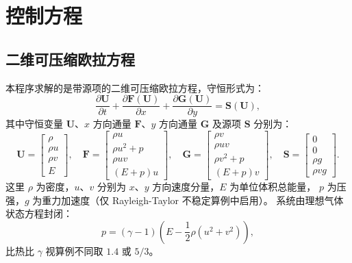 \documentclass{article}
\numberwithin{equation}{section}
\begin{document}
\section{控制方程}

\subsection{二维可压缩欧拉方程}

本程序求解的是带源项的二维可压缩欧拉方程，守恒形式为：
\begin{equation}
    \frac{\partial \mathbf{U}}{\partial t}
    + \frac{\partial \mathbf{F}(\mathbf{U})}{\partial x}
    + \frac{\partial \mathbf{G}(\mathbf{U})}{\partial y}
    = \mathbf{S}(\mathbf{U}),
\end{equation}
其中守恒变量 $\mathbf{U}$、$x$ 方向通量 $\mathbf{F}$、$y$ 方向通量 $\mathbf{G}$ 及源项 $\mathbf{S}$ 分别为：
\begin{equation}
    \mathbf{U} = \begin{bmatrix} \rho \\ \rho u \\ \rho v \\ E \end{bmatrix},\quad
    \mathbf{F} = \begin{bmatrix} \rho u \\ \rho u^2 + p \\ \rho uv \\ (E+p)u \end{bmatrix},\quad
    \mathbf{G} = \begin{bmatrix} \rho v \\ \rho uv \\ \rho v^2 + p \\ (E+p)v \end{bmatrix},\quad
    \mathbf{S} = \begin{bmatrix} 0 \\ 0 \\ \rho g \\ \rho v g \end{bmatrix}.
\end{equation}
这里 $\rho$ 为密度，$u$、$v$ 分别为 $x$、$y$ 方向速度分量，$E$ 为单位体积总能量，
$p$ 为压强，$g$ 为重力加速度（仅 Rayleigh-Taylor 不稳定算例中启用）。
系统由理想气体状态方程封闭：
\begin{equation}
    p = (\gamma - 1)\left(E - \frac{1}{2}\rho(u^2 + v^2)\right),
\end{equation}
比热比 $\gamma$ 视算例不同取 $1.4$ 或 $5/3$。
\end{document}
